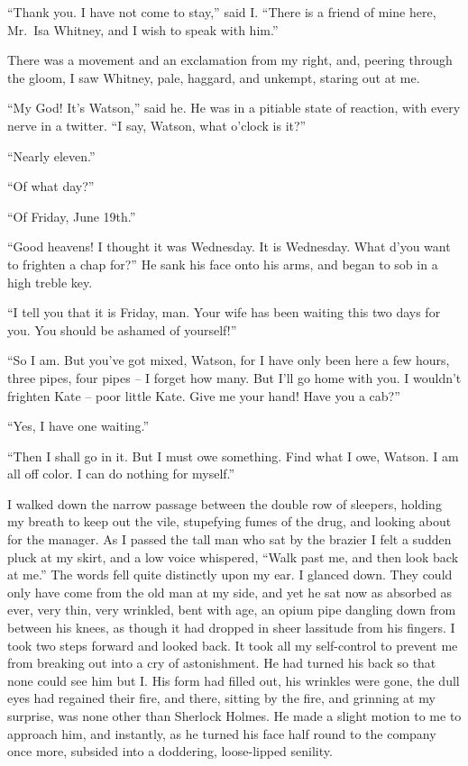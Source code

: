 “Thank you. I have not come to stay,” said I. “There
is a friend of mine here, Mr.~Isa Whitney, and I wish to speak
with him.”

There was a movement and an exclamation from my right,
and, peering through the gloom, I saw Whitney, pale, haggard,
and unkempt, staring out at me.

“My God! It’s Watson,” said he. He was in a pitiable
state of reaction, with every nerve in a twitter. “I say, Watson,
what o’clock is it?”

“Nearly eleven.”

“Of what day?”

“Of Friday, June 19th.”

“Good heavens! I thought it was Wednesday. It is Wed\-nesday.
What d’you want to frighten a chap for?” He sank
his face onto his arms, and began to sob in a high treble key.

“I tell you that it is Friday, man. Your wife has been
waiting this two days for you. You should be ashamed of
yourself!”

“So I am. But you’ve got mixed, Watson, for I have only
been here a few hours, three pipes, four pipes -- I forget how
many. But I’ll go home with you. I wouldn’t frighten Kate -- poor
little Kate. Give me your hand! Have you a cab?”

“Yes, I have one waiting.”

“Then I shall go in it. But I must owe something. Find
what I owe, Watson. I am all off color. I can do nothing
for myself.”

I walked down the narrow passage between the double row
of sleepers, holding my breath to keep out the vile, stupefying
fumes of the drug, and looking about for the manager. As I
passed the tall man who sat by the brazier I felt a sudden
pluck at my skirt, and a low voice whispered, “Walk past me,
and then look back at me.” The words fell quite distinctly
upon my ear. I glanced down. They could only have come
from the old man at my side, and yet he sat now as absorbed
as ever, very thin, very wrinkled, bent with age, an opium pipe
dangling down from between his knees, as though it had
dropped in sheer lassitude from his fingers. I took two steps
forward and looked back. It took all my self-control to prevent
me from breaking out into a cry of astonishment. He
had turned his back so that none could see him but I. His
form had filled out, his wrinkles were gone, the dull eyes had
regained their fire, and there, sitting by the fire, and grinning
at my surprise, was none other than Sherlock Holmes. He
made a slight motion to me to approach him, and instantly,
as he turned his face half round to the company once more,
subsided into a doddering, loose-lipped senility.

